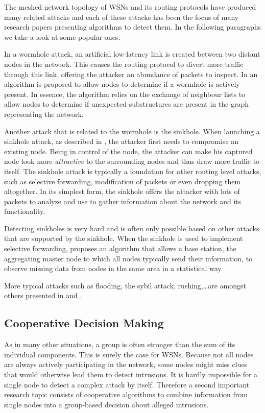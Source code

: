 \documentclass[conference]{IEEEtran}
\begin{document}
The meshed network topology of WSNs and its routing protocols have produced
many related attacks and each of these attacks has been the focus of many
research papers presenting algorithms to detect them. In the following
paragraphs we take a look at some popular ones.

In a wormhole attack, an artificial low-latency link is created between two
distant nodes in the network. This causes the routing protocol to divert more
traffic through this link, offering the attacker an abundance of packets to
inspect. In \cite{maheshwari2007detecting} an algorithm is proposed to allow
nodes to determine if a wormhole is actively present. In essence, the algorithm
relies on the exchange of neighbour lists to allow nodes to determine if
unexpected substructures are present in the graph representing the network.

Another attack that is related to the wormhole is the sinkhole. When launching
a sinkhole attack, as described in \cite{krontiris2008launching}, the attacker
first needs to compromise an existing node. Being in control of the node, the
attacker can make his captured node look more \emph{attractive} to the
surrounding nodes and thus draw more traffic to itself. The sinkhole attack is
typically a foundation for other routing level attacks, such as selective
forwarding, modification of packets or even dropping them altogether. In its
simplest form, the sinkhole offers the attacker with lots of packets to analyze
and use to gather information about the network and its functionality.

Detecting sinkholes is very hard and is often only possible based on other
attacks that are supported by the sinkhole. When the sinkhole is used to
implement selective forwarding, \cite{ngai2006intruder} proposes an algorithm
that allows a base station, the aggregating master node to which all nodes
typically send their information, to observe missing data from nodes in the
same area in a statistical way.

More typical attacks such as flooding, the sybil attack, rushing,\dots are
amongst others presented in \cite{wood2002denial} and \cite{djenouri2005survey}.

\subsection{Cooperative Decision Making}
\label{subsection:coorperative}

As in many other situations, a group is often stronger than the sum of its
individual components. This is surely the case for WSNs. Because not all nodes
are always actively participating in the network, some nodes might miss clues
that would otherwise lead them to detect intrusions. It is hardly impossible
for a single node to detect a complex attack by itself. Therefore a second
important research topic consists of cooperative algorithms to combine
information from single nodes into a group-based decision about alleged
intrusions.
\end{document}
